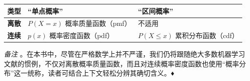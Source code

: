 \begin{longtable}{>{\raggedright\arraybackslash}p{\dimexpr(\textwidth-36pt)/3\relax} >{\raggedright\arraybackslash}p{\dimexpr(\textwidth-36pt)/3\relax} >{\raggedright\arraybackslash}p{\dimexpr(\textwidth-36pt)/3\relax}}
\hline
\textbf{类型} & \textbf{“单点概率”} & \textbf{“区间概率”} \\ \hline
\endhead
\textbf{离散} & $P(X = x)$ \newline  概率质量函数（pmf） & 不适用 \\ \hline
\textbf{连续} & $p(x)$ \newline  概率密度函数（pdf） & $P(X \leqslant x)$ \newline  累积分布函数（cdf） \\ \hline
\end{longtable}

\emph{备注} 。在本书中，尽管在严格数学上并不严谨，我们仍将跟随绝大多数机器学习文献的惯例，不仅对离散概率质量函数，而且对连续概率密度函数也使用“概率分布”这一统称，读者可结合上下文轻松分辨其确切含义。♦
